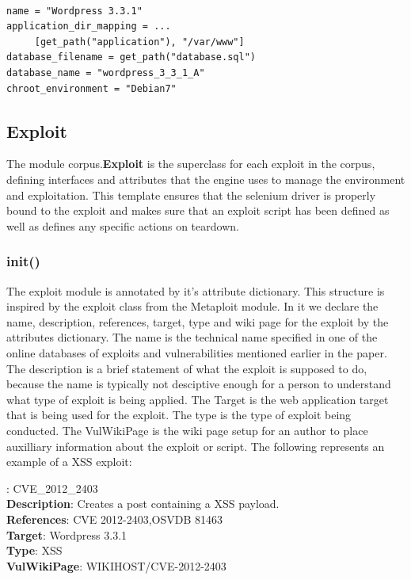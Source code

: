 \documentclass[letterpaper,twocolumn,10pt]{article}
\begin{document}
\begin{minipage}{\textwidth}
{\tt \footnotesize
\begin{lstlisting}
name = "Wordpress 3.3.1"
application_dir_mapping = ...
     [get_path("application"), "/var/www"]
database_filename = get_path("database.sql")
database_name = "wordpress_3_3_1_A"
chroot_environment = "Debian7"
\end{lstlisting}
} 
\end{minipage}


\subsection{Exploit}
The module corpus.{\bf Exploit} is the superclass for each exploit in the corpus, defining interfaces and attributes that the engine uses to manage the environment and exploitation.  This template ensures that the selenium driver is properly bound to the exploit and makes sure that an exploit script has been defined as well as defines any specific actions on teardown.



\subsubsection{init()}

The exploit module is annotated by it's attribute dictionary. This structure is inspired by the exploit class from the Metaploit module. In it we declare the name, description, references, target, type and wiki page for the exploit by the attributes dictionary.  The name is the technical name specified in one of the online databases of exploits and vulnerabilities mentioned earlier in the paper.  The description is a brief statement of what the exploit is supposed to do, because the name is typically not desciptive enough for a person to understand what type of exploit is being applied.  The Target is the web application target that is being used for the exploit.  The type is the type of exploit being conducted.  The VulWikiPage is the wiki page setup for an author to place auxilliary information about the exploit or script.  The following represents an example of a XSS exploit:\\

{\tt \small

:	CVE\_2012\_2403\\
{\bf Description}:		Creates a post containing a XSS payload.\\
{\bf References}:	CVE 2012-2403,OSVDB 81463 \\
{\bf Target}: 		Wordpress 3.3.1\\
{\bf Type}: 		XSS\\
{\bf VulWikiPage}: WIKIHOST/CVE-2012-2403

}
\end{document}
